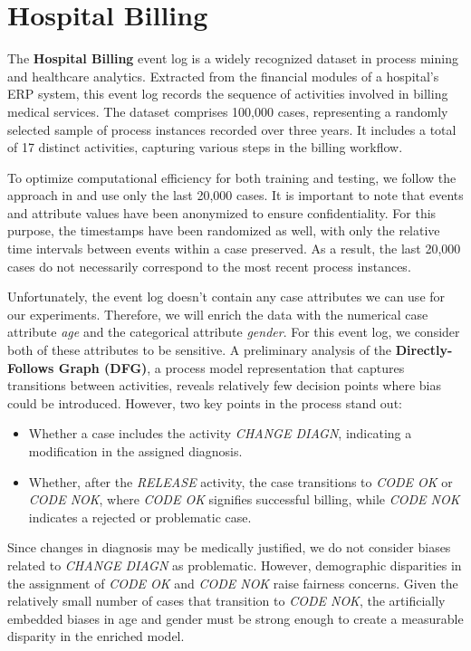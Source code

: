 \section{Hospital Billing}
The \textbf{Hospital Billing} \cite{hospital_billing} event log
is a widely recognized dataset in process mining and healthcare analytics.
Extracted from the financial modules of a hospital's ERP system,
this event log records the sequence of activities involved in billing medical services.
The dataset comprises 100,000 cases, representing a randomly selected sample of process instances recorded over three years.
It includes a total of 17 distinct activities, capturing various steps in the billing workflow.  

To optimize computational efficiency for both training and testing,
we follow the approach in \cite{fairness_foundation} and use only the last 20,000 cases.
It is important to note that events and attribute values have been anonymized to ensure confidentiality.
For this purpose, the timestamps have been randomized as well,
with only the relative time intervals between events within a case preserved.
As a result, the last 20,000 cases do not necessarily correspond to the most recent process instances.  

Unfortunately, the event log doesn't contain any case attributes we can use for our experiments.
Therefore, we will enrich the data with the numerical case attribute \textit{age}
and the categorical attribute \textit{gender}.
For this event log, we consider both of these attributes to be sensitive.
A preliminary analysis of the \textbf{Directly-Follows Graph (DFG)},
a process model representation that captures transitions between activities,
reveals relatively few decision points where bias could be introduced.
However, two key points in the process stand out:  
\begin{itemize}  
    \item Whether a case includes the activity \textit{CHANGE DIAGN}, indicating a modification in the assigned diagnosis.  
    \item Whether, after the \textit{RELEASE} activity, the case transitions to \textit{CODE OK} or \textit{CODE NOK},
    where \textit{CODE OK} signifies successful billing, while \textit{CODE NOK} indicates a rejected or problematic case.  
\end{itemize}  
Since changes in diagnosis may be medically justified,
we do not consider biases related to \textit{CHANGE DIAGN} as problematic.
However, demographic disparities in the assignment of \textit{CODE OK} and \textit{CODE NOK} raise fairness concerns.
Given the relatively small number of cases that transition to \textit{CODE NOK},
the artificially embedded biases in age and gender must be strong enough to create a measurable disparity in the enriched model.  

